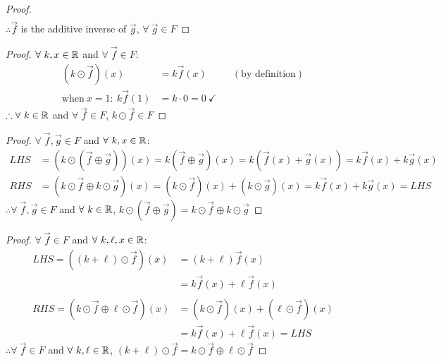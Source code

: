 \begin{enumerate}
\begin{proof}
\begin{align*}
    \end{align*}
    $\therefore \vec{f}$ is the additive inverse of $\vec{g}$, $\forall~\vec{g} \in F$
  \end{proof}
  \begin{proof}
    $\forall~k,x \in \mathbb{R}$ and $\forall~\vec{f} \in F$:
    \begin{align*}
      (k \odot \vec{f})(x)         & = k\vec{f}(x)              &  & (\text{by definition}) \\
      \text{when}~x=1:~k\vec{f}(1) & = k \cdot 0 = 0~\checkmark
    \end{align*}
    $\therefore \forall~k \in \mathbb{R}$ and $\forall~\vec{f} \in F$, $k\odot\vec{f} \in F$
  \end{proof}
  \begin{proof}
    $\forall~\vec{f},\vec{g} \in F$ and $\forall~k, x \in \mathbb{R}$:
    \begin{align*}
      LHS & = (k \odot (\vec{f} \oplus \vec{g}))(x) = k(\vec{f} \oplus \vec{g})(x) = k(\vec{f}(x) + \vec{g}(x)) = k\vec{f}(x) + k\vec{g}(x) \\
      RHS & = (k \odot \vec{f} \oplus k \odot \vec{g})(x) = (k \odot \vec{f})(x) + (k \odot \vec{g})(x) = k\vec{f}(x) + k\vec{g}(x) = LHS
    \end{align*}
    $\therefore \forall~\vec{f},\vec{g} \in F$ and $\forall~k \in \mathbb{R}$, $k \odot (\vec{f} \oplus \vec{g}) = k \odot \vec{f} \oplus k \odot \vec{g}$
  \end{proof}
  \begin{proof}
    $\forall~\vec{f} \in F$ and $\forall~k, \ell, x \in \mathbb{R}$:
    \begin{align*}
      LHS = ((k + \ell) \odot \vec{f})(x)                  & = (k+\ell)\vec{f}(x)                             \\
                                                           & = k\vec{f}(x) + \ell\vec{f}(x)                   \\ \\
      RHS = (k \odot \vec{f} \oplus \ell \odot \vec{f})(x) & = (k \odot \vec{f})(x) + (\ell \odot \vec{f})(x) \\
                                                           & = k\vec{f}(x) + \ell\vec{f}(x) = LHS
    \end{align*}
    $\therefore \forall~\vec{f} \in F$ and $\forall~k, \ell \in \mathbb{R}$, $(k + \ell) \odot \vec{f} = k \odot \vec{f} \oplus \ell \odot \vec{f}$
  \end{proof}

\end{enumerate}
